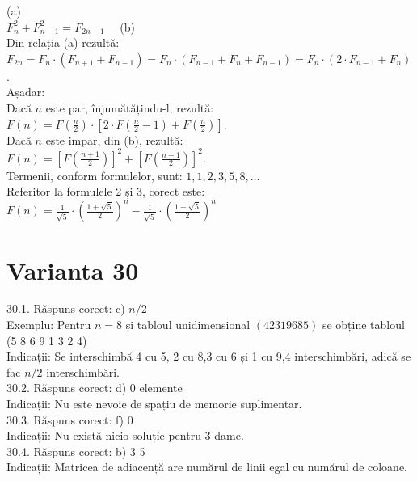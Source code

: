 (a)\\ $F_{n}^{2}+F_{n-1}^{2}=F_{2 n-1} \quad$ (b)\\ Din relația (a) rezultă:\\ $F_{2 n}=F_{n} \cdot\left(F_{n+1}+F_{n-1}\right)=F_{n} \cdot\left(F_{n-1}+F_{n}+F_{n-1}\right)=F_{n} \cdot\left(2 \cdot F_{n-1}+F_{n}\right)$.\\ Așadar:\\ Dacă $n$ este par, înjumătățindu-l, rezultă:\\ $F(n)=F\left(\frac{n}{2}\right) \cdot\left[2 \cdot F\left(\frac{n}{2}-1\right)+F\left(\frac{n}{2}\right)\right]$.\\ Dacă $n$ este impar, din (b), rezultă:\\ $F(n)=\left[F\left(\frac{n+1}{2}\right)\right]^{2}+\left[F\left(\frac{n-1}{2}\right)\right]^{2}$.\\ Termenii, conform formulelor, sunt: $1,1,2,3,5,8, \ldots$\\ Referitor la formulele 2 și 3, corect este: $F(n)=\frac{1}{\sqrt{5}} \cdot\left(\frac{1+\sqrt{5}}{2}\right)^{n}-\frac{1}{\sqrt{5}} \cdot\left(\frac{1-\sqrt{5}}{2}\right)^{n}$\\

\section*{Varianta 30}

30.1. Răspuns corect: c) $n / 2$\\
Exemplu: Pentru $n=8$ și tabloul unidimensional $(4 2 3 1 9 6 8 5)$ se obține tabloul (5 8 6 9 1 3 2 4)\\ Indicații: Se interschimbă 4 cu 5, 2 cu 8,3 cu 6 și 1 cu 9,4 interschimbări, adică se fac $n/2$ interschimbări.\\

30.2. Răspuns corect: d) 0 elemente\\
Indicații: Nu este nevoie de spațiu de memorie suplimentar.\\

30.3. Răspuns corect: f) 0\\
Indicații: Nu există nicio soluție pentru 3 dame.\\

30.4. Răspuns corect: b) 3 5\\
Indicații: Matricea de adiacență are numărul de linii egal cu numărul de coloane.\\

